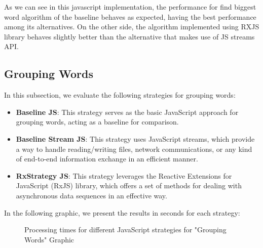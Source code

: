 As we can see in this javascript implementation, the performance for find biggest word algorithm of the baseline behaves as expected, having the best performance among its alternatives. On the other side, the algorithm implemented using RXJS library behaves slightly better than the alternative that makes use of JS streams API.


\clearpage



\subsection{Grouping Words}
\label{subsec:grouping_words_js}

In this subsection, we evaluate the following strategies for grouping words:

\begin{itemize}
    \item \textbf{Baseline JS}: This strategy serves as the basic JavaScript approach for grouping words, acting as a baseline for comparison.
    \item \textbf{Baseline Stream JS}: This strategy uses JavaScript streams, which provide a way to handle reading/writing files, network communications, or any kind of end-to-end information exchange in an efficient manner.
    \item \textbf{RxStrategy JS}: This strategy leverages the Reactive Extensions for JavaScript (RxJS) library, which offers a set of methods for dealing with asynchronous data sequences in an effective way.
\end{itemize}

In the following graphic, we present the results in seconds for each strategy:


\begin{figure}[H]
    \raggedright
    \caption{Processing times for different JavaScript strategies for "Grouping Words" Graphic}
    \label{fig:grouping_words_processing_times_js}
\end{figure}

